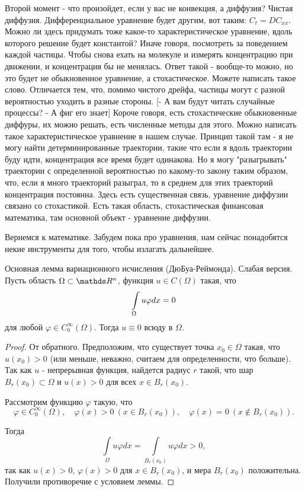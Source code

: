 Второй момент - что произойдет, если у вас не конвекция, а диффузия? Чистая диффузия. Дифференциальное уравнение будет другим, вот таким: $C_t = DC_{xx}$. Можно ли здесь придумать тоже какое-то характеристическое уравнение, вдоль которого решение будет константой? Иначе говоря, посмотреть за поведением каждой частицы. Чтобы снова ехать на молекуле и измерять концентрацию при движении, и концентрация бы не менялась. Ответ такой - вообще-то можно, но это будет не обыкновенное уравнение, а стохастическое. Можете написать такое слово. Отличается тем, что, помимо чистого дрейфа, частицы могут с разной вероятностью уходить в разные стороны. [- А вам будут читать случайные процессы? - А фиг его знает] Короче говоря, есть стохастические обыкновенные диффуры, их можно решать, есть численные методы для этого. Можно написать такое характеристическое уравнение в нашем случае. Принцип такой там - я не могу найти детерминированные траектории, такие что если я вдоль траектории буду идти, концентрация все время будет одинакова. Но я могу "разыгрывать" траектории с определенной вероятностью по какому-то закону таким образом, что, если я много траекторий разыграл, то в среднем для этих траекторий концентрация постоянна. Здесь есть существенная связь, уравнение диффузии связано со стохастикой. Есть такая область, стохастическая финансовая математика, там основной объект - уравнение диффузии.

Вернемся к математике. Забудем пока про уравнения, нам сейчас понадобятся некие инструменты для того, чтобы излагать дальнейшее.

\begin{lemma}{Основная лемма вариационного исчисления (ДюБуа-Реймонда). Слабая версия.}
Пусть область $\Omega \subset \real^n$, функция $u \in C(\Omega)$ такая, что 
$$\displaystyle \int \limits_{\Omega} u \varphi dx = 0$$ 
для любой $\varphi \in C_0^\infty(\Omega)$. Тогда $u \equiv 0$ всюду в $\Omega$.
\end{lemma}

\begin{proof}
От обратного. Предположим, что существует точка $x_0 \in \Omega$ такая, что $u(x_0) > 0$ (или меньше, неважно, считаем для определенности, что больше). 
Так как $u$ - непрерывная функция, найдется радиус $r$ такой, что шар $B_r(x_0) \subset \Omega$ и $u(x) > 0$ для всех $x \in B_r(x_0)$.

Рассмотрим функцию $\varphi$ такую, что 
$$\varphi \in C_0^\infty(\Omega),\quad \varphi(x) > 0 \ (x \in B_r(x_0)),\quad \varphi(x) = 0 \ (x \notin B_r(x_0)).$$

Тогда
$$\int \limits_{\Omega} u \varphi dx = \int \limits_{B_r(x_0)} u \varphi dx > 0,$$ 
так как $u(x) > 0$, $\varphi(x) > 0$ для $x \in B_r(x_0)$, и мера $B_r(x_0)$ положительна. Получили противоречие с условием леммы.
\end{proof}

